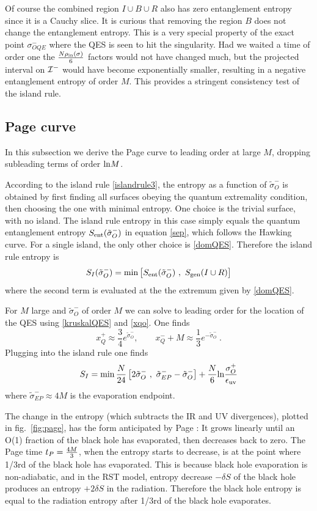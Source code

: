 \documentclass[11pt,oneside,letterpaper]{article}
\newcommand{\f}{\frac}
\newcommand{\be}{\begin{equation}}
\newcommand{\ee}{\end{equation}}
\def\be{\begin{eqnarray}}
\def\ee{\end{eqnarray}}
\let\s=\sigma \let\t=\tau \let\u=\upsilon \let\c=\chi
\let\f=\frac
\def\be{\begin{equation}}
\def\ee{\end{equation}}
\def\m{{M}}
\def\log{{\rm ln}}
\numberwithin{equation}{section}
\def \be {\begin{equation}}
\def \ee {\end{equation}}
\begin{document}
Of course the combined region $I\cup B\cup R$ also has zero entanglement entropy since it is a Cauchy slice. It is curious that removing the region $B$ does not change the entanglement entropy. This is a very special property of the exact point $\s^-_{OQE}$ where the QES is seen to hit the singularity. Had we waited a time of order one the $N\rho_{\text{in}}(\s) \over 6 $ factors would not have changed much, but the projected interval on ${\cal I}^-$ would have become exponentially smaller, resulting in a negative entanglement entropy of order $M$.  This provides a stringent consistency  test of the island rule. 


 


\subsection{Page curve}
In this subsection we derive the Page curve to leading order at large $\m$, dropping subleading terms of order $\log M$. 

According to the island rule \eqref{islandrule3}, the entropy as a function of $\tilde \s^-_O$ is obtained by first finding all surfaces obeying the quantum extremality condition, then choosing the one with minimal entropy. One choice is the trivial surface, with no island. The island rule entropy in this case simply equals the quantum entanglement entropy $S_{\rm ent}(\tilde \s^-_O   )$ in equation \eqref{sep}, which follows the Hawking curve.  For a single island, the only other choice is \eqref{domQES}. Therefore the island rule entropy is 
\be
S_I(\tilde \s^-_O) = \min\left[ S_{\rm ent}(\tilde \s^-_O   ) \ , \ S_{\rm gen}(I \cup R) \right]
\ee
where the second term is evaluated at the  the extremum given by \eqref{domQES}.


For $M$ large and $\tilde \sigma_O^-$ of order $M$ we can solve to leading order for the location of the QES using  \eqref{kruskalQES} and \eqref{xqo}. One finds 
\be\label{approxQ}
x^+_Q \approx \frac{3}{4} e^{ \tilde{\sigma}_O^- } , \qquad
x^-_Q +\m\approx \frac{1}{3}e^{- \tilde{\sigma}_O^-} \ .
\ee
Plugging into the island rule one finds
\be
S_I = \min\frac{N}{24}\left[ 2\tilde{\sigma}_O^- \ , \
\tilde{\sigma}^-_{EP} - \tilde{\sigma}_O^- \right]+{N \over 6}\log \f{\s^+_O}{\epsilon_{\text{uv}}}
\ee
where $\tilde{\sigma}^-_{EP}  \approx 4 \m $ is the evaporation endpoint. 

The change in the entropy (which subtracts the IR and UV divergences), plotted in fig.~\ref{fig:page}, has the form anticipated by Page \cite{Page:1993wv,Page:2013dx}: It grows linearly until an O(1) fraction of the black hole has evaporated, then decreases back to zero. 
The Page time $t_P={4\m \over 3}$, when the entropy starts to decrease, is at the point where 1/3rd of the black hole has evaporated. This is because black hole evaporation is non-adiabatic, and in the RST model,  entropy decrease $-\delta S$ of the black hole produces an entropy $+2\delta S$ in the radiation. Therefore the black hole entropy is equal to the radiation entropy after 1/3rd of the black hole evaporates.
\end{document}
